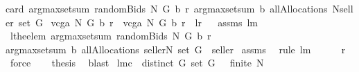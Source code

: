 \begin{isabellebody}
{\isachardoublequoteopen}card\ {\isacharparenleft}{\isacharparenleft}argmax{\isasymcirc}setsum{\isacharparenright}\ {\isacharparenleft}randomBids{\isacharprime}\ N\ G\ b\ r{\isacharparenright}\ {\isacharparenleft}{\isacharparenleft}argmax{\isasymcirc}setsum{\isacharparenright}\ b\ {\isacharparenleft}allAllocations\ {\isacharparenleft}N{\isasymunion}{\isacharbraceleft}seller{\isacharbraceright}{\isacharparenright}\ {\isacharparenleft}set\ G{\isacharparenright}{\isacharparenright}{\isacharparenright}{\isacharparenright}{\isacharequal}{}{\isachardoublequoteclose}\isanewline
{}\ {\isachardoublequoteopen}vcga\ N\ G\ b\ r\ {\isacharequal}\ vcga{\isacharprime}\ N\ G\ b\ r{\isachardoublequoteclose}\ {\isacharparenleft}\ {\isachardoublequoteopen}{\isacharquery}l{\isacharequal}{\isacharquery}r{\isachardoublequoteclose}{\isacharparenright}%
\isadelimproof
\ %
\endisadelimproof
%
\isatagproof
{}\isamarkupfalse%
\ assms\ lm{}{}{}\isanewline
{}\isamarkupfalse%
\ {\isacharminus}\isanewline
{}\isamarkupfalse%
\ {\isachardoublequoteopen}{\isacharquery}l{\isacharequal}{\isacharparenleft}the{\isacharunderscore}elem\ {\isacharparenleft}{\isacharparenleft}argmax{\isasymcirc}setsum{\isacharparenright}\ {\isacharparenleft}randomBids{\isacharprime}\ N\ G\ b\ r{\isacharparenright}\ \isanewline
{\isacharparenleft}{\isacharparenleft}argmax{\isasymcirc}setsum{\isacharparenright}\ b\ {\isacharparenleft}allAllocations\ {\isacharparenleft}{\isacharbraceleft}seller{\isacharbraceright}{\isasymunion}N{\isacharparenright}\ {\isacharparenleft}set\ G{\isacharparenright}{\isacharparenright}{\isacharparenright}{\isacharparenright}{\isacharparenright}\ {\isacharminus}{\isacharminus}\ seller{\isachardoublequoteclose}\isanewline
{}\isamarkupfalse%
\ assms\ \isamarkupfalse%
\ {\isacharparenleft}rule\ lm{}{}{}{\isacharparenright}\ \isamarkupfalse%
\ \isamarkupfalse%
\ {\isachardoublequoteopen}{\isachardot}{\isachardot}{\isachardot}\ {\isacharequal}\ {\isacharquery}r{\isachardoublequoteclose}\ \isamarkupfalse%
\ force\ \isamarkupfalse%
\ \isamarkupfalse%
\ {\isacharquery}thesis\ \isamarkupfalse%
\ blast\isanewline
{}\isamarkupfalse%
%
\endisatagproof
{\isafoldproof}%
%
\isadelimproof
%
\endisadelimproof
\isanewline
\isanewline
{}\isamarkupfalse%
\ lm{}{}c{\isacharcolon}\ \ {\isachardoublequoteopen}distinct\ G{\isachardoublequoteclose}\ {\isachardoublequoteopen}set\ G\ {\isasymnoteq}\ {\isacharbraceleft}{\isacharbraceright}{\isachardoublequoteclose}\ {\isachardoublequoteopen}finite\ N{\isachardoublequoteclose}\ \isanewline

\end{isabellebody}
